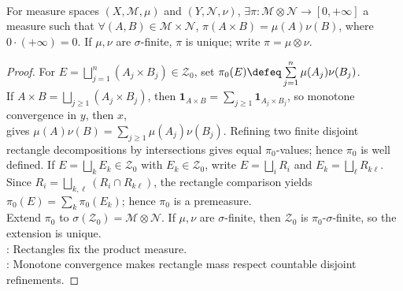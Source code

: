 \begin{theorem} \label{thm:abstract-product-measure-existence-uniqueness} \\
For measure spaces $(X,\mathcal{M},\mu)$ and $(Y,\mathcal{N},\nu)$, $\exists\pi:\mathcal{M}\otimes\mathcal{N}\to[0,+\infty]$ a measure such that $\forall(A,B)\in\mathcal{M}\times\mathcal{N}$, $\pi(A\times B)=\mu(A)\nu(B)$, where $0\cdot(+\infty)=0$. If $\mu,\nu$ are $\sigma$-finite, $\pi$ is unique; write $\pi=\mu\otimes\nu$.
\begin{proof}
For $E=\bigsqcup\limits_{j=1}^n(A_j\times B_j)\in\mathcal{Z}_0$, set $\pi_0(E)\defeq\sum\limits_{j=1}^n\mu(A_j)\nu(B_j)$.\\
If $A\times B=\bigsqcup\limits_{j\geq1}(A_j\times B_j)$, then $\mathbf{1}_{A\times B}=\sum\limits_{j\geq1}\mathbf{1}_{A_j\times B_j}$, so monotone convergence in $y$, then $x$,\\
gives $\mu(A)\nu(B)=\sum\limits_{j\geq1}\mu(A_j)\nu(B_j)$. Refining two finite disjoint rectangle decompositions by intersections gives equal $\pi_0$-values; hence $\pi_0$ is well defined. If $E=\bigsqcup\limits_kE_k\in\mathcal{Z}_0$ with $E_k\in\mathcal{Z}_0$, write $E=\bigsqcup\limits_iR_i$ and $E_k=\bigsqcup\limits_\ell R_{k\ell}$.\\
Since $R_i=\bigsqcup\limits_{k,\ell}(R_i\cap R_{k\ell})$, the rectangle comparison yields $\pi_0(E)=\sum\limits_k\pi_0(E_k)$; hence $\pi_0$ is a premeasure.\\
Extend $\pi_0$ to $\sigma(\mathcal{Z}_0)=\mathcal{M}\otimes\mathcal{N}$. If $\mu,\nu$ are $\sigma$-finite, then $\mathcal{Z}_0$ is $\pi_0$-$\sigma$-finite, so the extension is unique.\\
: Rectangles fix the product measure.\\
: Monotone convergence makes rectangle mass respect countable disjoint refinements.
\end{proof}
\end{theorem}

